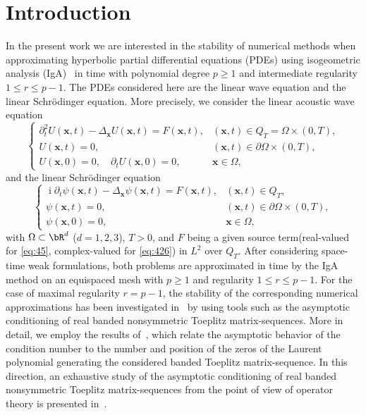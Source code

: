 \documentclass[addpoints,12pt,letter]{article}
\DeclareMathOperator{\mi}{i} %
\newcommand{\bx}{\boldsymbol{x}}
\newcommand{\De}{\Delta}
\newcommand{\Om}{\Omega}
\newcommand{\TF}{T}
\renewcommand{\ge}{\geqslant}
\renewcommand{\le}{\leqslant}
\numberwithin{equation}{section}
\theoremstyle{definition}
\begin{document}
\section{Introduction}

In the present work we are interested in the stability of numerical methods when approximating hyperbolic partial differential equations (PDEs) using isogeometric analysis (IgA)~\cite{CoHu09,HuCoBa05} in time with polynomial degree $p\ge 1$ and intermediate regularity $1\le r\le p-1$.
The PDEs considered here are the linear wave equation and the linear Schrödinger equation.
More precisely, we consider the linear acoustic wave equation
\begin{equation}\label{eq:45}
\begin{cases}
\partial_{t}^{2} U(\bx,t)-\De_{\bx} U(\bx,t)=F(\bx,t), & (\bx,t)\in Q_{\TF}=\Om\times (0,\TF),\\
U(\bx, t)=0, & (\bx, t)\in\partial\Om\times (0, \TF),\\
U(\bx, 0)=0,\quad\partial_{t} U(\bx, 0)=0, &\bx\in\Om,
\end{cases}
\end{equation}
and the linear Schrödinger equation
\begin{equation}\label{eq:426}
\begin{cases}
\mi\partial_{t}\psi(\bx,t)-\De_{\bx}\psi(\bx,t)=F(\bx,t), & (\bx,t)\in Q_{\TF},\\[1ex]
\psi(\bx, t)=0, & (\bx, t)\in\partial\Om\times (0, \TF ),\\[1ex]
\psi(\bx, 0)=0, & \bx\in\Om,
\end{cases}
\end{equation}
with $\Om\subset\bR^{d}$ ($d=1,2,3$), $\TF>0$, and $F$ being a given source term(real-valued for \eqref{eq:45}, complex-valued for \eqref{eq:426}) in $L^{2}$ over $Q_{\TF}$.
After considering space-time weak formulations, both problems are approximated in time by the IgA method on an equispaced mesh with $p\ge 1$ and regularity $1\le r\le p-1$.
For the case of maximal regularity $r=p-1$, the stability of the corresponding numerical approximations has been investigated in~\cite{FeFr26,FeFrLoPe25,FeGo25} by using tools such as the asymptotic conditioning of real banded nonsymmetric Toeplitz matrix-sequences.
More in detail, we employ the results of~\cite{AmoBru96}, which relate the asymptotic behavior of the condition number to the number and position of the zeros of the Laurent polynomial generating the considered banded Toeplitz matrix-sequence.
In this direction, an exhaustive study of the asymptotic conditioning of real banded nonsymmetric Toeplitz matrix-sequences from the point of view of operator theory is presented in~\cite{BoGr99}.
\end{document}
